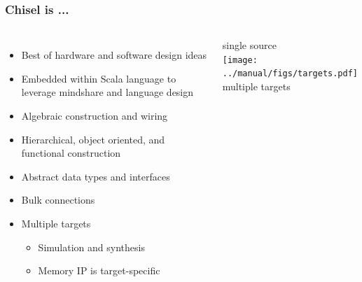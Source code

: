 \documentclass[xcolor=pdflatex,dvipsnames,table]{beamer}
\begin{document}
\begin{frame}[fragile]
\frametitle{Chisel is ...}

\begin{columns}[c]


\begin{itemize}
\item Best of hardware and software design ideas
\item Embedded within Scala language to leverage mindshare and language design
\item Algebraic construction and wiring
\item Hierarchical, object oriented, and functional construction
\item Abstract data types and interfaces
\item Bulk connections
\item Multiple targets
\begin{itemize}
\item Simulation and synthesis
\item Memory IP is target-specific
\end{itemize}
\end{itemize}


\begin{center}
single source \\
\texttt{[image: ../manual/figs/targets.pdf]} \\
multiple targets \\
\end{center}

\end{columns}

\end{frame}
\end{document}
